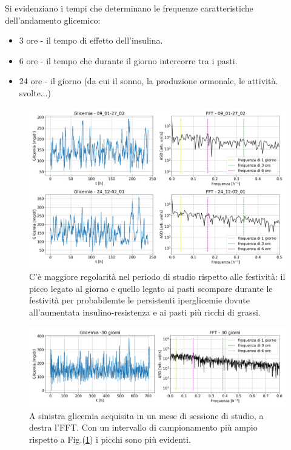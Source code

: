 \documentclass{article}
\begin{document}
        Si evidenziano i tempi che determinano le frequenze caratteristiche dell'andamento glicemico:
            \begin{itemize}
                \item 3 ore - il tempo di effetto dell'insulina.
                \item 6 ore - il tempo che durante il giorno intercorre tra i pasti.
                \item 24 ore - il giorno (da cui il sonno, la produzione ormonale, le attività.
                svolte...)
            \end{itemize}
            \begin{figure}[H]
                \centering
                \includegraphics[width=\textwidth]{rubbish/rubbish.png}
                \caption{C'è maggiore regolarità nel 
                periodo di studio rispetto alle festività: il picco legato
                al giorno e quello legato ai pasti scompare durante le festività 
                per probabilemte le persistenti iperglicemie dovute all'aumentata 
                insulino-resistenza e ai pasti più ricchi di grassi.}
                \label{fig:rubbish}
            \end{figure} 

            \begin{figure}[H]
                \centering
                \includegraphics[width=\textwidth]{rubbish/porcheria.png}
                \caption{A sinistra glicemia acquisita in un mese di sessione di studio,
                 a destra l'FFT. Con un intervallo di campionamento più ampio rispetto 
                 a Fig.(\ref{fig:rubbish}) i picchi sono più evidenti.}
                \label{fig:rubbish1}
            \end{figure} 
\end{document}
